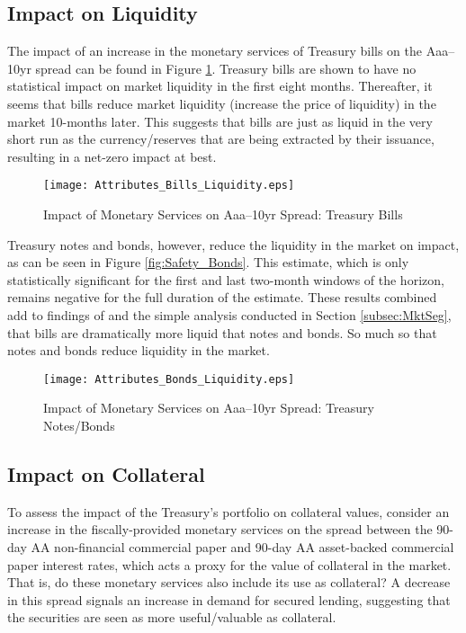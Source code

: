 \documentclass[11pt,a4paper,margin=1.5in]{article}
\begin{document}
\subsection{Impact on Liquidity}
The impact of an increase in the monetary services of Treasury bills on the Aaa--10yr spread can be found in Figure \ref{fig:Liquidity_Bills}.
Treasury bills are shown to have no statistical impact on market liquidity in the first eight months.
Thereafter, it seems that bills reduce market liquidity (increase the price of liquidity) in the market 10-months later. 
This suggests that bills are just as liquid in the very short run as the currency/reserves that are being extracted by their issuance, resulting in a net-zero impact at best.
\begin{figure}[p]
\centering
\texttt{[image: Attributes\_Bills\_Liquidity.eps]}
\caption{Impact of Monetary Services on Aaa--10yr Spread: Treasury Bills}
\label{fig:Liquidity_Bills}
\end{figure}

Treasury notes and bonds, however, reduce the liquidity in the market on impact, as can be seen in Figure \ref{fig:Safety_Bonds}.
This estimate, which is only statistically significant for the first and last two-month windows of the horizon, remains negative for the full duration of the estimate.
These results combined add to findings of \citet{Amihud-Mendelson:1991} and the simple analysis conducted in Section \ref{subsec:MktSeg}, that bills are dramatically more liquid that notes and bonds. 
So much so that notes and bonds reduce liquidity in the market.
\begin{figure}[p]
\centering
\texttt{[image: Attributes\_Bonds\_Liquidity.eps]}
\caption{Impact of Monetary Services on Aaa--10yr Spread: Treasury Notes/Bonds}
\label{fig:Liquidity_Bonds}
\end{figure}

\subsection{Impact on Collateral}
To assess the impact of the Treasury's portfolio on collateral values, consider an increase in the fiscally-provided monetary services on the spread between the 90-day AA non-financial commercial paper and 90-day AA asset-backed commercial paper interest rates, which acts a proxy for the value of collateral in the market.
That is, do these monetary services also include its use as collateral?
A decrease in this spread signals an increase in demand for secured lending, suggesting that the securities are seen as more useful/valuable as collateral.
\end{document}
